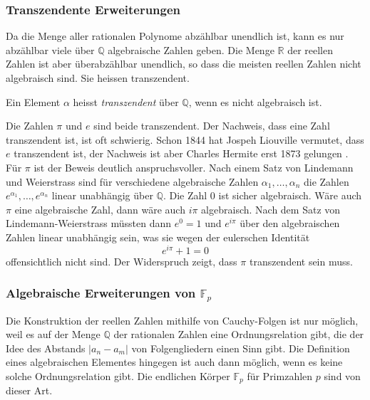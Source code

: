 %
%
\subsubsection{Transzendente Erweiterungen}
Da die Menge aller rationalen Polynome abzählbar unendlich ist,
kann es nur abzählbar viele über $\mathbb{Q}$ algebraische 
Zahlen geben.
Die Menge $\mathbb{R}$ der reellen Zahlen ist aber überabzählbar
unendlich, so dass die meisten reellen Zahlen nicht algebraisch
sind.
Sie heissen transzendent.

\begin{definition}[transzendent]
Ein Element $\alpha$ heisst \emph{transzendent} über $\mathbb{Q}$,
wenn es nicht algebraisch ist.
%
\end{definition}

Die Zahlen $\pi$ und $e$ sind beide transzendent.
Der Nachweis, dass eine Zahl transzendent ist, ist oft schwierig.
Schon 1844 hat Jospeh Liouville vermutet, dass $e$ transzendent 
%
ist, der Nachweis ist aber Charles Hermite erst 1873 gelungen
\cite{buch:hermitebeweis}.
%
Für $\pi$ ist der Beweis deutlich anspruchsvoller.
Nach einem Satz von Lindemann und Weierstrass
%
%
\cite{buch:lindemann-weierstrass} sind für verschiedene
algebraische Zahlen $\alpha_1,\dots,\alpha_n$
die Zahlen $e^{\alpha_1},\dots,e^{\alpha_n}$ linear unabhängig
über $\mathbb{Q}$.
Die Zahl $0$ ist sicher algebraisch.
Wäre auch $\pi$ eine algebraische Zahl, dann wäre auch $i\pi$ algebraisch.
Nach dem Satz von Lindemann-Weierstrass müssten dann $e^0=1$ und
$e^{i\pi}$ über den algebraischen Zahlen linear unabhängig sein,
was sie wegen der eulerschen Identität
%
%
\[
e^{i\pi}+1=0
\]
offensichtlich nicht sind.
Der Widerspruch zeigt, dass $\pi$ transzendent sein muss.

%
%
\subsubsection{Algebraische Erweiterungen von $\mathbb{F}_p$}
Die Konstruktion der reellen Zahlen mithilfe von Cauchy-Folgen ist
nur möglich, weil es auf der Menge $\mathbb{Q}$ der rationalen
Zahlen eine Ordnungsrelation gibt, die der Idee des Abstands
$|a_n-a_m|$ von Folgengliedern einen Sinn gibt.
Die Definition eines algebraischen Elementes hingegen ist auch dann 
möglich, wenn es keine solche Ordnungsrelation gibt.
Die endlichen Körper $\mathbb{F}_p$ für Primzahlen $p$ sind von
dieser Art.

